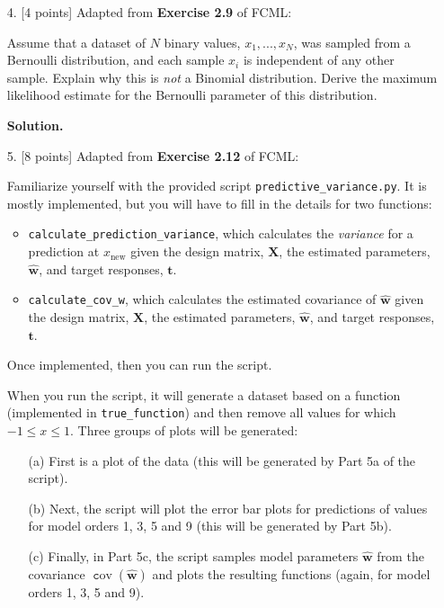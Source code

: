\documentclass[10pt]{article}
\DeclareMathOperator{\cov}{\texttt cov}
\begin{document}
\begin{itemize}
{\bf Solution.}



\item[4.] [4 points]
Adapted from {\bf Exercise 2.9} of FCML:

Assume that a dataset of $N$ binary values, $x_1, ..., x_N$, was sampled from a Bernoulli distribution, and each sample $x_i$ is independent of any other sample.  Explain why this is {\em not} a Binomial distribution.  Derive the maximum likelihood estimate for the Bernoulli parameter of this distribution.

{\bf Solution.} 



\item[5.] [8 points]
Adapted from {\bf Exercise 2.12} of FCML:

Familiarize yourself with the provided script {\tt predictive\_variance.py}.  
It is mostly implemented, but you will have to fill in the details for two functions: 
\begin{itemize}
\item {\tt calculate\_prediction\_variance}, which calculates the {\em variance} for a prediction at $x_{\mathrm{new}}$ given the design matrix, $\mathbf{X}$, the estimated parameters, $\mathbf{\hat{w}}$, and target responses, $\mathbf{t}$.
\item {\tt calculate\_cov\_w}, which calculates the estimated covariance of $\mathbf{\hat{w}}$ given the design matrix, $\mathbf{X}$, the estimated parameters, $\mathbf{\hat{w}}$, and target responses, $\mathbf{t}$.
\end{itemize}
Once implemented, then you can run the script.

When you run the script, it will generate a dataset based on a function (implemented in {\tt true\_function}) and then remove all values for which $-1 \leq x \leq 1$.  Three groups of plots will be generated:
\begin{enumerate}
\item[(a)] First is a plot of the data (this will be generated by Part 5a of the script).  
\item[(b)] Next, the script will plot the error bar plots for predictions of values for model orders 1, 3, 5 and 9 (this will be generated by Part 5b).  
\item[(c)] Finally, in Part 5c, the script samples model parameters $\mathbf{\hat{w}}$ from the covariance $\cov(\mathbf{\hat{w}})$ and plots the resulting functions (again, for model orders 1, 3, 5 and 9).
\end{enumerate}


\end{itemize}
\end{document}
